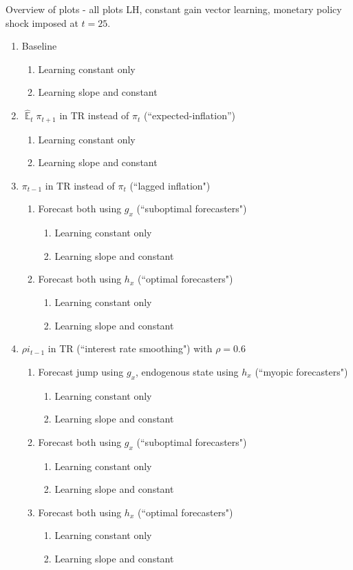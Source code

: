 \documentclass[11pt]{article}
\renewcommand{\[}{\begin{equation}}
\renewcommand{\]}{\end{equation}}
\DeclareMathOperator{\E}{\mathbb{E}}
\begin{document}
\newpage
\noindent Overview of plots - all plots LH, constant gain vector learning, monetary policy shock imposed at $t=25$.
\begin{enumerate}
\item Baseline
	\begin{enumerate}
	\item Learning constant only
	\item Learning slope and constant
	\end{enumerate}
\item $\hat{\E}_t\pi_{t+1}$ in TR instead of $\pi_t$ (``expected-inflation'')
	\begin{enumerate}
	\item Learning constant only
	\item Learning slope and constant
	\end{enumerate}
\item $\pi_{t-1}$ in TR instead of $\pi_t$ (``lagged inflation")
	\begin{enumerate}
	\item Forecast both using $g_x$ (``suboptimal forecasters")
		\begin{enumerate}
		\item Learning constant only
		\item Learning slope and constant
		\end{enumerate}
	\item Forecast both using $h_x$ (``optimal forecasters")
		\begin{enumerate}
		\item Learning constant only
		\item Learning slope and constant
		\end{enumerate}
	\end{enumerate}

\item $\rho i_{t-1}$ in TR (``interest rate smoothing") with $\rho=0.6$
\begin{enumerate}
\item Forecast jump using $g_x$, endogenous state using $h_x$ (``myopic forecasters")
\begin{enumerate}
\item Learning constant only
\item Learning slope and constant
\end{enumerate}
\item Forecast both using $g_x$ (``suboptimal forecasters")
\begin{enumerate}
\item Learning constant only
\item Learning slope and constant
\end{enumerate}
\item Forecast both using $h_x$ (``optimal forecasters")
\begin{enumerate}
\item Learning constant only
\item Learning slope and constant
\end{enumerate}
\end{enumerate}

\end{enumerate}
\newpage
\end{document}
